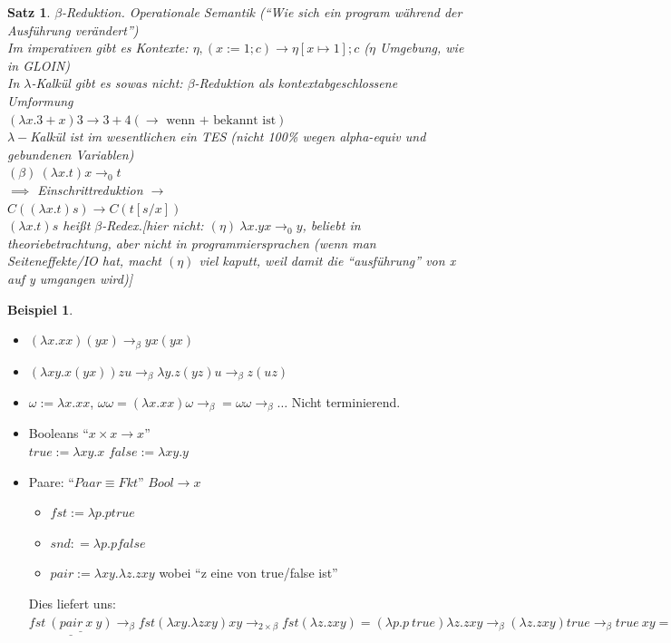 \documentclass{article}
\newtheorem{satz}{Satz}
\theoremstyle{definition}
\newtheorem{beispiel}{Beispiel}[section]
\begin{document}
	\begin{satz} $\beta$-Reduktion. Operationale Semantik (``Wie sich ein program während der Ausführung verändert'')\\
	Im imperativen gibt es Kontexte:
	$\eta, (x:=1;c)\to \eta[x\mapsto 1];c$ ($\eta$ Umgebung, wie in GLOIN)\\
	In $\lambda$-Kalkül gibt es sowas nicht: $\beta$-Reduktion als kontextabgeschlossene Umformung\\
	$(\lambda x.3+x)3\to 3+4(\to \text{ wenn + bekannt ist})$\\
	$\lambda-$Kalkül ist im wesentlichen ein TES (nicht 100\% wegen alpha-equiv und gebundenen Variablen)\\
	$(\beta) \ (\lambda x.t)x\to_0 t$\\
	$\implies$ Einschrittreduktion $\to$\\
	$C((\lambda x.t)s)\to C(t[s/x])$\\
	$(\lambda x.t)s$ heißt $\beta$-Redex.[hier nicht: $(\eta)\ \lambda x.y x\to_0 y$, beliebt in theoriebetrachtung, aber nicht in programmiersprachen (wenn man Seiteneffekte/IO hat, macht $(\eta)$ viel kaputt, weil damit die ``ausführung'' von x auf y umgangen wird)]\\
	\end{satz}
	\begin{beispiel}\ \\
	\begin{itemize}
		\item $(\lambda x.xx)(y x)\to_\beta y x(y x)$
		\item $(\lambda xy.x(yx))zu\to_\beta \lambda y.z(yz)u\to_\beta z(uz)$
		\item $\omega:=\lambda x.xx$, $\omega\omega= (\lambda x.xx)\omega \to_\beta = \omega\omega\to_\beta\dots$ Nicht terminierend.
		\item Booleans ``$x\times x \to x$''\\
		 $true:=\lambda xy.x$ $false:=\lambda xy.y$\\
		\item Paare: ``$Paar \equiv Fkt$'' $Bool\to x$\\
		 \begin{itemize}
		 	\item $fst:= \lambda p.p true$
		 	\item $snd : = \lambda p.p false$
		 	\item $pair:= \lambda xy.\lambda z.zxy$ wobei ``z eine von true/false ist''
		 \end{itemize}
		 Dies liefert uns:\\
		 $\underline{fst\ \underline{(pair\ x\ y)}}\to_\beta fst (\lambda xy.\lambda zxy)xy\to_{2\times\beta} fst(\lambda z.zxy)=(\lambda p.p\ true)\lambda z.zxy\to_\beta (\lambda z.zxy)true\to_\beta true\ xy=(\lambda xy. x)xy \to_\beta (\lambda y.x)y\to_\beta x$\\
	\end{itemize}
	\end{beispiel}
\end{document}
